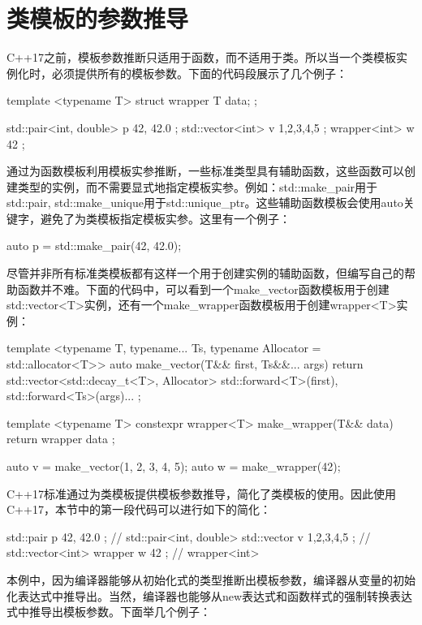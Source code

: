 \section{类模板的参数推导}
C++17之前，模板参数推断只适用于函数，而不适用于类。所以当一个类模板实例化时，必须提供所有的模板参数。下面的代码段展示了几个例子：

\begin{cpp}
template <typename T>
struct wrapper
{
	T data;
};

std::pair<int, double> p{ 42, 42.0 };
std::vector<int> v{ 1,2,3,4,5 };
wrapper<int> w{ 42 };
\end{cpp}

通过为函数模板利用模板实参推断，一些标准类型具有辅助函数，这些函数可以创建类型的实例，而不需要显式地指定模板实参。例如：std::make\_pair用于std::pair, std::make\_unique用于std::unique\_ptr。这些辅助函数模板会使用auto关键字，避免了为类模板指定模板实参。这里有一个例子：

\begin{cpp}
auto p = std::make_pair(42, 42.0);
\end{cpp}

尽管并非所有标准类模板都有这样一个用于创建实例的辅助函数，但编写自己的帮助函数并不难。下面的代码中，可以看到一个make\_vector函数模板用于创建std::vector<T>实例，还有一个make\_wrapper函数模板用于创建wrapper<T>实例：

\begin{cpp}
template <typename T, typename... Ts,
typename Allocator = std::allocator<T>>
auto make_vector(T&& first, Ts&&... args)
{
	return std::vector<std::decay_t<T>, Allocator> {
		std::forward<T>(first),
		std::forward<Ts>(args)...
	};
}

template <typename T>
constexpr wrapper<T> make_wrapper(T&& data)
{
	return wrapper{ data };
}

auto v = make_vector(1, 2, 3, 4, 5);
auto w = make_wrapper(42);
\end{cpp}

C++17标准通过为类模板提供模板参数推导，简化了类模板的使用。因此使用C++17，本节中的第一段代码可以进行如下的简化：

\begin{cpp}
std::pair p{ 42, 42.0 }; // std::pair<int, double>
std::vector v{ 1,2,3,4,5 }; // std::vector<int>
wrapper w{ 42 }; // wrapper<int>
\end{cpp}

本例中，因为编译器能够从初始化式的类型推断出模板参数，编译器从变量的初始化表达式中推导出。当然，编译器也能够从new表达式和函数样式的强制转换表达式中推导出模板参数。下面举几个例子：

